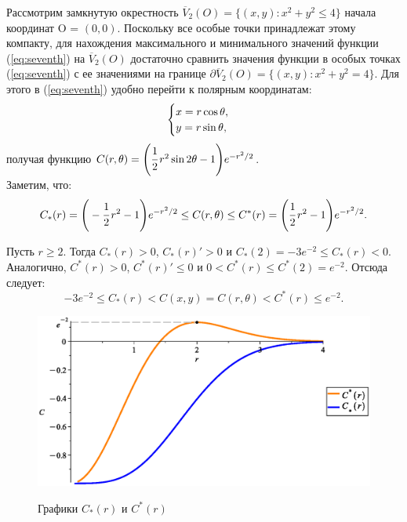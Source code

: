 Рассмотрим замкнутую окрестность $\overline{V}_2(O) = \{(x,y): x^2 + y^2 \leq 4\}$ начала координат O = $(0,0)$. Поскольку все особые точки принадлежат этому компакту, для нахождения максимального и минимального значений функции (\ref{eq:seventh}) на $\overline{V}_2(O)$ достаточно сравнить значения функции в особых точках (\ref{eq:seventh}) с ее значениями на границе $\partial \overline{V}_2(O) = \{(x,y): x^2 + y^2 = 4\}$. Для этого в (\ref{eq:seventh}) удобно перейти к полярным координатам:\smallskip
\begin{equation}
     \begin{cases}
         x = r \cos{\theta},\cr
         y = r \sin{\theta},
     \end{cases}
     \label{eq:eight}
\end{equation}
получая функцию $C(r, \theta) = \Bigg(\cfrac{1}{2}\,r^2\sin{2\theta} - 1\Bigg)e^{-r^2/2}$.\\

Заметим, что:
\begin{equation}
  C_*(r) = \Bigg(-\cfrac{1}{2}\,r^2 - 1\Bigg)e^{-r^2/2} \leq C(r, \theta) \leq C^*(r) = \Bigg(\cfrac{1}{2}\,r^2 - 1\Bigg)e^{-r^2/2}. 
  \label{eq:ninth}
\end{equation}

Пусть $r \geq 2$. Тогда $C_*(r) > 0$, $C_*(r) ' > 0$ и $C_* (2) = -3e^{-2} \leq C_* (r) < 0$. Аналогично, $C^*(r) > 0$, $C^*(r) ' \leq 0$ и $0<C^* (r)\leq C^* (2) = e^{-2} $. Отсюда следует:
$$-3e^{-2} \leq C_* (r) < C(x,y) = C(r, \theta)<C^* (r) \leq e^{-2}.$$

\begin{figure}[ht!]%
    \begin{center}
    {\includegraphics[scale=0.7]{mmrcd2.eps} }%
    \caption{Графики $C_*(r)$ и $C^*(r)$}%
    \label{fig:first}
    \end{center}%
\end{figure}

